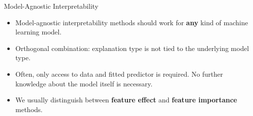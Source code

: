 \documentclass[11pt,compress,t,notes=noshow, xcolor=table]{beamer}
\begin{document}
\begin{vbframe}{Model-Agnostic Interpretability}
 \begin{itemize}
  \itemsep2em
  \item Model-agnostic interpretability methods should work for \textbf{any} kind of machine learning model.
  \item Orthogonal combination: explanation type is not tied to the underlying model type.
  \item Often, only access to data and fitted predictor is required. No further knowledge about the model itself is necessary.
  \item We usually distinguish between \textbf{feature effect} and \textbf{feature importance} methods.
 \end{itemize}
\end{vbframe}
\end{document}
